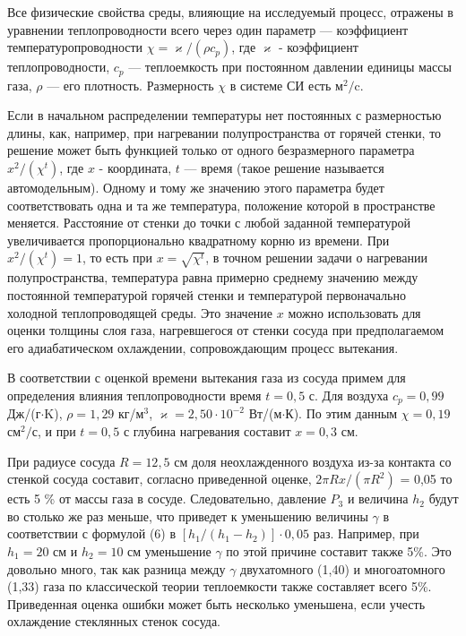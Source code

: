 \documentclass[a4paper,12pt]{article} %
\begin{document}
Все физические свойства среды, влияющие на исследуемый процесс, отражены в уравнении теплопроводности всего через один параметр — коэффициент температуропроводности $\chi = \varkappa / (\rho c_{p})$, где $\varkappa$ - коэффициент теплопроводности, $c_{p}$ — теплоемкость при постоянном давлении единицы массы газа, $\rho$ — его плотность. Размерность $\chi$ в системе СИ есть $\text{м}^2/\text{c}$.


Если в начальном распределении температуры нет постоянных с размерностью длины, как, например, при нагревании полупространства от горячей стенки, то решение может быть функцией только от одного безразмерного параметра $x^2/(\chi^t)$, где $x$ - координата, $t$ — время (такое решение называется автомодельным). Одному и тому же значению этого параметра будет соответствовать одна и та же температура, положение которой в пространстве меняется. Расстояние от стенки до точки с любой заданной температурой увеличивается пропорционально квадратному корню из времени. При $x^2/(\chi ^t) = 1$, то есть при $x = \sqrt{\chi ^t}$, в точном решении задачи о нагревании полупространства, температура равна примерно среднему значению между постоянной температурой горячей стенки и температурой первоначально холодной теплопроводящей среды. Это значение $x$ можно использовать для оценки толщины слоя газа, нагревшегося от стенки сосуда при предполагаемом его адиабатическом охлаждении, сопровождающим процесс вытекания.


В соответствии с оценкой времени вытекания газа из сосуда примем для определения влияния теплопроводности время $t = 0,5$ с. Для воздуха $c_{p} = 0,99$ Дж/(г$\cdot$K), $\rho = 1,29$ кг/м$^3$, $\varkappa = 2,50 \cdot 10^{-2}$ Вт/(м$\cdot$К). По этим данным $\chi = 0,19$ см$^2/$с,
и при $t = 0,5$ с глубина нагревания составит $x = 0,3$ см.


При радиусе сосуда $R = 12,5$ см доля неохлажденного воздуха из-за контакта со стенкой сосуда составит, согласно приведенной оценке, $2\pi Rx/(\pi R^2)$ = 0,05 то есть 5 \% от массы газа в сосуде. Следовательно, давление $P_{3}$ и величина $h_{2}$ будут во столько же раз меньше, что приведет к уменьшению величины $\gamma$ в соответствии с формулой (6) в $[h_{1}/(h_{1} - h_{2})] \cdot 0,05$ раз. Например, при $h_{1} = 20$ см и $h_{2} = 10$ см уменьшение $\gamma$ по этой причине составит также 5\%. Это довольно много, так как разница между $\gamma$ двухатомного (1,40) и многоатомного (1,33) газа по классической теории теплоемкости также составляет всего 5\%. Приведенная оценка ошибки может быть несколько уменьшена, если учесть охлаждение стеклянных стенок сосуда.
\end{document}
